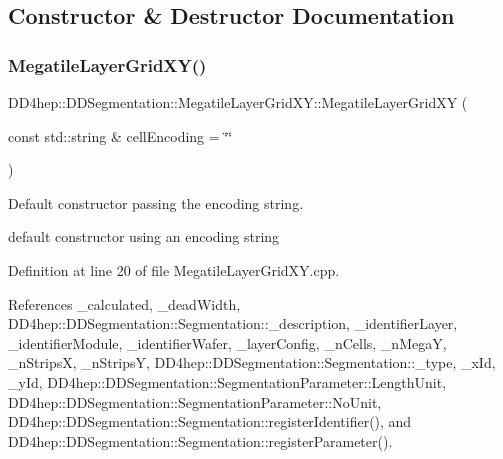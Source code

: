\subsection{Constructor \& Destructor Documentation}
\hypertarget{class_d_d4hep_1_1_d_d_segmentation_1_1_megatile_layer_grid_x_y_a9795d16d3a1423824a95e6b753dc90e8}{}\label{class_d_d4hep_1_1_d_d_segmentation_1_1_megatile_layer_grid_x_y_a9795d16d3a1423824a95e6b753dc90e8} 
\subsubsection{\texorpdfstring{Megatile\+Layer\+Grid\+X\+Y()}{MegatileLayerGridXY()}\hspace{0.1cm}{\footnotesize\ttfamily [1/2]}}
{\footnotesize\ttfamily D\+D4hep\+::\+D\+D\+Segmentation\+::\+Megatile\+Layer\+Grid\+X\+Y\+::\+Megatile\+Layer\+Grid\+XY (\begin{DoxyParamCaption}\item[{const std\+::string \&}]{cell\+Encoding = {\ttfamily \char`\"{}\char`\"{}} }\end{DoxyParamCaption})}



Default constructor passing the encoding string. 

default constructor using an encoding string 

Definition at line 20 of file Megatile\+Layer\+Grid\+X\+Y.\+cpp.



References \+\_\+calculated, \+\_\+dead\+Width, D\+D4hep\+::\+D\+D\+Segmentation\+::\+Segmentation\+::\+\_\+description, \+\_\+identifier\+Layer, \+\_\+identifier\+Module, \+\_\+identifier\+Wafer, \+\_\+layer\+Config, \+\_\+n\+Cells, \+\_\+n\+MegaY, \+\_\+n\+StripsX, \+\_\+n\+StripsY, D\+D4hep\+::\+D\+D\+Segmentation\+::\+Segmentation\+::\+\_\+type, \+\_\+x\+Id, \+\_\+y\+Id, D\+D4hep\+::\+D\+D\+Segmentation\+::\+Segmentation\+Parameter\+::\+Length\+Unit, D\+D4hep\+::\+D\+D\+Segmentation\+::\+Segmentation\+Parameter\+::\+No\+Unit, D\+D4hep\+::\+D\+D\+Segmentation\+::\+Segmentation\+::register\+Identifier(), and D\+D4hep\+::\+D\+D\+Segmentation\+::\+Segmentation\+::register\+Parameter().

